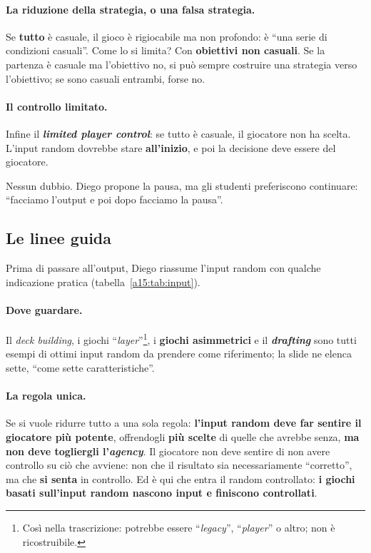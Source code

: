 \paragraph{La riduzione della strategia, o una falsa strategia.} Se \textbf{tutto} è casuale,
il gioco è rigiocabile ma non profondo: è ``una serie di condizioni casuali''. Come lo si
limita? Con \textbf{obiettivi non casuali}. Se la partenza è casuale ma l'obiettivo no, si
può sempre costruire una strategia verso l'obiettivo; se sono casuali entrambi, forse no.

\paragraph{Il controllo limitato.} Infine il \textbf{\emph{limited player control}}: se tutto
è casuale, il giocatore non ha scelta. L'input random dovrebbe stare \textbf{all'inizio}, e
poi la decisione deve essere del giocatore.

Nessun dubbio. Diego propone la pausa, ma gli studenti preferiscono continuare: ``facciamo
l'output e poi dopo facciamo la pausa''.

\subsection{Le linee guida}

Prima di passare all'output, Diego riassume l'input random con qualche indicazione pratica
(tabella~\ref{a15:tab:input}).

\paragraph{Dove guardare.} Il \emph{deck building}, i giochi
``\emph{layer}''\footnote{Così nella trascrizione: potrebbe essere ``\emph{legacy}'',
``\emph{player}'' o altro; non è ricostruibile.}, i \textbf{giochi asimmetrici} e il
\textbf{\emph{drafting}} sono tutti esempi di ottimi input random da prendere come
riferimento; la slide ne elenca sette, ``come sette caratteristiche''.

\paragraph{La regola unica.} Se si vuole ridurre tutto a una sola regola: \textbf{l'input
random deve far sentire il giocatore più potente}, offrendogli \textbf{più scelte} di quelle
che avrebbe senza, \textbf{ma non deve togliergli l'\emph{agency}}. Il giocatore non deve
sentire di non avere controllo su ciò che avviene: non che il risultato sia necessariamente
``corretto'', ma che \textbf{si senta} in controllo. Ed è qui che entra il random controllato:
\textbf{i giochi basati sull'input random nascono input e finiscono controllati}.

